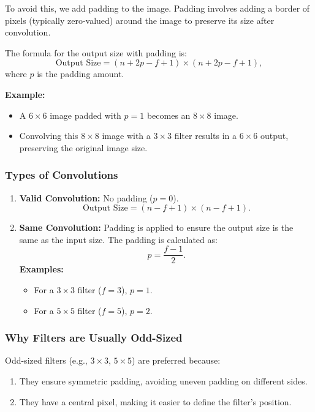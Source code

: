 \documentclass[letterpaper,12pt,notitlepage,twoside]{report}
\begin{document}
To avoid this, we add padding to the image. Padding involves adding a border of pixels (typically zero-valued) around the image to preserve its size after convolution.

The formula for the output size with padding is:
\[
\text{Output Size} = (n + 2p - f + 1) \times (n + 2p - f + 1),
\]
where \(p\) is the padding amount.

\textbf{Example:}
\begin{itemize}[nosep]
    \item A \(6 \times 6\) image padded with \(p = 1\) becomes an \(8 \times 8\) image.
    \item Convolving this \(8 \times 8\) image with a \(3 \times 3\) filter results in a \(6 \times 6\) output, preserving the original image size.
\end{itemize}

\subsubsection*{Types of Convolutions}
\begin{enumerate}
    \item \textbf{Valid Convolution:} No padding (\(p = 0\)).
    \[
    \text{Output Size} = (n - f + 1) \times (n - f + 1).
    \]

    \item \textbf{Same Convolution:} Padding is applied to ensure the output size is the same as the input size. The padding is calculated as:
    \[
    p = \frac{f - 1}{2}.
    \]
    \textbf{Examples:}
    \begin{itemize}[nosep]
        \item For a \(3 \times 3\) filter (\(f = 3\)), \(p = 1\).
        \item For a \(5 \times 5\) filter (\(f = 5\)), \(p = 2\).
    \end{itemize}
\end{enumerate}

\subsubsection*{Why Filters are Usually Odd-Sized}
Odd-sized filters (e.g., \(3 \times 3\), \(5 \times 5\)) are preferred because:
\begin{enumerate}[nosep]
    \item They ensure symmetric padding, avoiding uneven padding on different sides.
    \item They have a central pixel, making it easier to define the filter’s position.
\end{enumerate}
\end{document}
